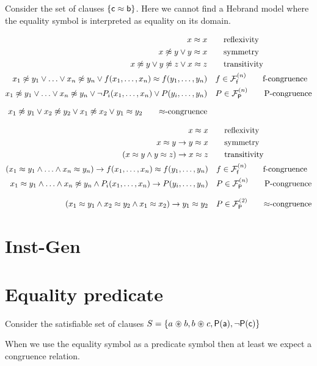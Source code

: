 \begin{example}
	Consider the set of clauses $\{ {\mathsf c} \approx {\mathsf b} \}$. Here we cannot find a Hebrand model where the equality symbol is interpreted as equality on its domain.
\end{example}

\begin{align*}
	 x \mEQ x & \tag*{reflexivity} \\
	x \mNE y \lor y \mEQ x & \tag*{symmetry}\\
	x\mNE y\lor y\mNE z\lor x\mEQ z & \tag*{transitivity} \\
	x_1 \mNE y_1\lor\ldots\lor x_n \mNE y_n\lor f(x_1,\ldots,x_n)\mEQ f(y_1,\ldots,y_n) &\quad f\in\mcFfn
	\tag*{f-congruence}
	\\
	x_1\mNE y_1\lor\ldots\lor x_n\mNE y_n\lor\lnot P_i(x_1,\ldots,x_n)\lor P(y_i,\ldots,y_n) &\quad P\in\mcFPn
	\tag*{P-congruence}
	\\[0.7em]
	x_1\mNE y_1\lor x_2\mNE y_2
	\lor x_1\mNE x_2
	\lor y_1\mEQ y_2
	\tag*{$\mEQ$-congruence}
\end{align*}

\begin{align*}
	x \mEQ x & \tag*{reflexivity} 
	\\
	x \mEQ y \limp y \mEQ x & \tag*{symmetry}
	\\
	(x\mEQ y\land y\mEQ z)\limp x\mEQ z & \tag*{transitivity} 
	\\
	(x_1 \mEQ y_1\land\ldots\land x_n \mEQ y_n)\limp f(x_1,\ldots,x_n)\mEQ f(y_1,\ldots,y_n) &\quad f\in\mcFfn
	\tag*{f-congruence}
	\\
	x_1\mEQ y_1\land\ldots\land x_n\mNE y_n\land P_i(x_1,\ldots,x_n)
	\limp P(y_i,\ldots,y_n) &\quad P\in\mcFPn
	\tag*{P-congruence}
	\\[0.7em]
	(x_1\mEQ y_1
	\land x_2\mEQ y_2
	\land x_1\mEQ x_2)
	\limp y_1\mEQ y_2
	& \quad P\in\mcFPn[2]
		\tag*{$\mEQ$-congruence}
\end{align*}
	
	



\section{Inst-Gen}

\section{Equality predicate}

Consider the satisfiable set of clauses $S = \{a \mathrel{\circledast} b, b \mathrel{\circledast} c, {\mathsf P}({\mathsf a}), \lnot {\mathsf P}({\mathsf c}) \}$

When we use the equality symbol as a predicate symbol 
then at least we expect a congruence relation.



